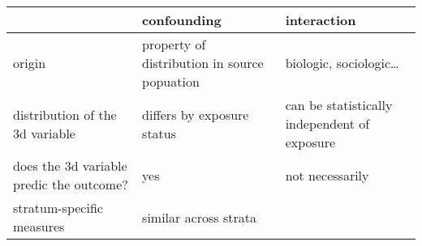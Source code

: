 \documentclass[
]{article}
\begin{document}
\begin{longtable}[]{@{}lll@{}}
\toprule
\begin{minipage}[b]{0.24\columnwidth}\raggedright
\strut
\end{minipage} & \begin{minipage}[b]{0.42\columnwidth}\raggedright
confounding\strut
\end{minipage} & \begin{minipage}[b]{0.26\columnwidth}\raggedright
interaction\strut
\end{minipage}\tabularnewline
\midrule
\endhead
\begin{minipage}[t]{0.24\columnwidth}\raggedright
origin\strut
\end{minipage} & \begin{minipage}[t]{0.42\columnwidth}\raggedright
property of distribution in source popuation\strut
\end{minipage} & \begin{minipage}[t]{0.26\columnwidth}\raggedright
biologic, sociologic\ldots{}\strut
\end{minipage}\tabularnewline
\begin{minipage}[t]{0.24\columnwidth}\raggedright
distribution of the 3d variable\strut
\end{minipage} & \begin{minipage}[t]{0.42\columnwidth}\raggedright
differs by exposure status\strut
\end{minipage} & \begin{minipage}[t]{0.26\columnwidth}\raggedright
can be statistically independent of exposure\strut
\end{minipage}\tabularnewline
\begin{minipage}[t]{0.24\columnwidth}\raggedright
does the 3d variable predic the outcome?\strut
\end{minipage} & \begin{minipage}[t]{0.42\columnwidth}\raggedright
yes\strut
\end{minipage} & \begin{minipage}[t]{0.26\columnwidth}\raggedright
not necessarily\strut
\end{minipage}\tabularnewline
\begin{minipage}[t]{0.24\columnwidth}\raggedright
stratum-specific measures\strut
\end{minipage} & \begin{minipage}[t]{0.42\columnwidth}\raggedright
similar across strata\strut
\end{minipage} & \begin{minipage}[t]{0.26\columnwidth}\raggedright

\end{minipage}
\end{longtable}
\end{document}
